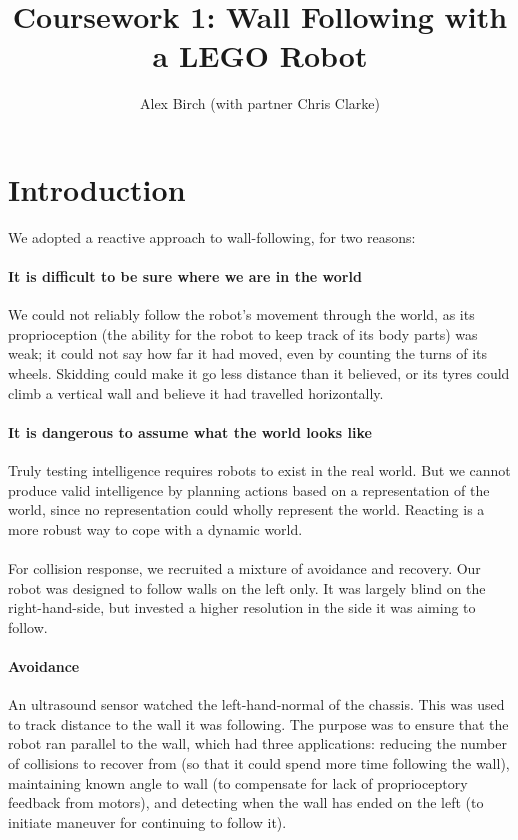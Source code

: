 \documentclass[a4paper,12pt]{article}
\title{Coursework 1:  Wall Following with a LEGO Robot}
\author{Alex Birch (with partner Chris Clarke)}
\begin{document}
\maketitle

\section{Introduction}
We adopted a reactive approach to wall-following, for two reasons:
\paragraph{It is difficult to be sure where we are in the world} We could not reliably follow the robot's movement through the world, as its proprioception (the ability for the robot to keep track of its body parts)\cite{lee2002proprioception} was weak; it could not say how far it had moved, even by counting the turns of its wheels. Skidding could make it go less distance than it believed, or its tyres could climb a vertical wall and believe it had travelled horizontally.
\paragraph{It is dangerous to assume what the world looks like} Truly testing intelligence requires robots to exist in the real world. But we cannot produce valid intelligence by planning actions based on a representation of the world, since no representation could wholly represent the world\cite{brooks1991intelligence}. Reacting is a more robust way to cope with a dynamic world.
\\
\\
For collision response, we recruited a mixture of avoidance and recovery. Our robot was designed to follow walls on the left only. It was largely blind on the right-hand-side, but invested a higher resolution in the side it was aiming to follow.
\paragraph{Avoidance} An ultrasound sensor watched the left-hand-normal of the chassis. This was used to track distance to the wall it was following. The purpose was to ensure that the robot ran parallel to the wall, which had three applications: reducing the number of collisions to recover from (so that it could spend more time following the wall), maintaining known angle to wall (to compensate for lack of proprioceptory feedback from motors), and detecting when the wall has ended on the left (to initiate maneuver for continuing to follow it).
\end{document}
